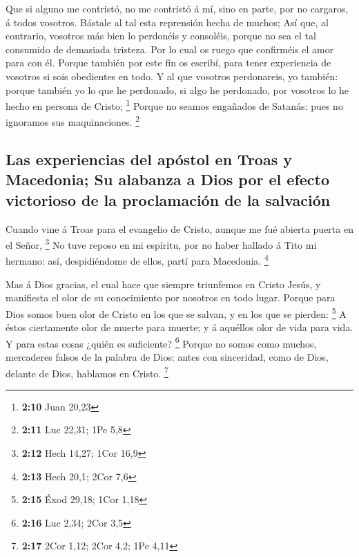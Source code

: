  Que si alguno me contristó, no me contristó á mí, sino en
parte, por no cargaros, á todos vosotros.  Bástale al tal
esta reprensión hecha de muchos;  Así que, al contrario,
vosotros más bien lo perdonéis y consoléis, porque no sea el tal
consumido de demasiada tristeza.  Por lo cual os ruego que
confirméis el amor para con él.  Porque también por este fin
os escribí, para tener experiencia de vosotros si sois obedientes en
todo.  Y al que vosotros perdonareis, yo también: porque
también yo lo que he perdonado, si algo he perdonado, por vosotros lo he
hecho en persona de Cristo; \footnote{\textbf{2:10} Juan 20,23}
 Porque no seamos engañados de Satanás: pues no ignoramos
sus maquinaciones. \footnote{\textbf{2:11} Luc 22,31; 1Pe 5,8}

\hypertarget{las-experiencias-del-apuxf3stol-en-troas-y-macedonia-su-alabanza-a-dios-por-el-efecto-victorioso-de-la-proclamaciuxf3n-de-la-salvaciuxf3n}{%
\subsection{Las experiencias del apóstol en Troas y Macedonia; Su
alabanza a Dios por el efecto victorioso de la proclamación de la
salvación}\label{las-experiencias-del-apuxf3stol-en-troas-y-macedonia-su-alabanza-a-dios-por-el-efecto-victorioso-de-la-proclamaciuxf3n-de-la-salvaciuxf3n}}

 Cuando vine á Troas para el evangelio de Cristo, aunque me
fué abierta puerta en el Señor, \footnote{\textbf{2:12} Hech 14,27; 1Cor
  16,9}  No tuve reposo en mi espíritu, por no haber
hallado á Tito mi hermano: así, despidiéndome de ellos, partí para
Macedonia. \footnote{\textbf{2:13} Hech 20,1; 2Cor 7,6}

 Mas á Dios gracias, el cual hace que siempre triunfemos en
Cristo Jesús, y manifiesta el olor de su conocimiento por nosotros en
todo lugar.  Porque para Dios somos buen olor de Cristo en
los que se salvan, y en los que se pierden: \footnote{\textbf{2:15} Éxod
  29,18; 1Cor 1,18}  A éstos ciertamente olor de muerte
para muerte; y á aquéllos olor de vida para vida. Y para estas cosas
¿quién es suficiente? \footnote{\textbf{2:16} Luc 2,34; 2Cor 3,5}
 Porque no somos como muchos, mercaderes falsos de la
palabra de Dios: antes con sinceridad, como de Dios, delante de Dios,
hablamos en Cristo. \footnote{\textbf{2:17} 2Cor 1,12; 2Cor 4,2; 1Pe
  4,11}

